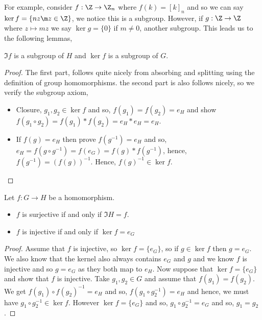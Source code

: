 For example, consider $f : \Z \to \Z_n$ where $f (k) = [k]_n$ and so we can say $\ker f = \{nz \m z \in \Z\}$, we notice this is a subgroup. However, if $g : \Z \to \Z$ where $z \mapsto mz$ we say $\ker g = \{0\}$ if $m \ne 0$, another subgroup. This leads us to the following lemmas,
\begin{nlemma}
  $\Im f$ is a subgroup of $H$ and $\ker f$ is a subgroup of $G$.
\end{nlemma}
\begin{proof}
  The first part, follows quite nicely from absorbing and splitting using the definition of group homomorphisms. the second part is also follows nicely, so we verify the subgroup axiom,
  \begin{itemize}
    \item Closure, $g_1, g_2 \in \ker f$ and so, $f(g_1) = f(g_2) = e_H$ and show $f(g_1 \circ g_2) = f(g_1) * f(g_2) = e_H * e_H = e_H$.
    \item If $f(g) = e_H$ then prove $f(g^{-1}) = e_H$ and so, $e_H = f(g \circ g^{-1}) = f(e_G) = f(g) * f(g^{-1})$, hence, $f(g^{-1}) = (f(g))^{-1}$. Hence, $f(g)^{-1} \in \ker f$.
  \end{itemize}
\end{proof}

\begin{nlemma}
  Let $f: G \to H$ be a homomorphism.
  \begin{itemize}
    \item $f$ is surjective if and only if $\Im H = f$.
    \item $f$ is injective if and only if $\ker f = e_G$
  \end{itemize}
\end{nlemma}
\begin{proof}
  Assume that $f$ is injective, so $\ker f = \{e_G\}$, so if $g \in \ker f$ then $g = e_G$. We also know that the kernel also always contains $e_G$ and $g$ and we know $f$ is injective and so $g = e_G$ as they both map to $e_H$. Now suppose that $\ker f =  \{e_G\}$ and show that $f$ is injective. Take $g_1, g_2 \in G$ and assume that $f(g_1) = f(g_2)$. We get $f(g_1) \circ f(g_2)^{-1} = e_H$ and so, $f(g_1 \circ g_2^{-1}) = e_H$ and hence, we must have $g_1 \circ g_2^{-1} \in \ker f$. However $\ker f = \{e_G\}$ and so, $g_1 \circ g_2^{-1} = e_G$ and so, $g_1 = g_2$.
\end{proof}

